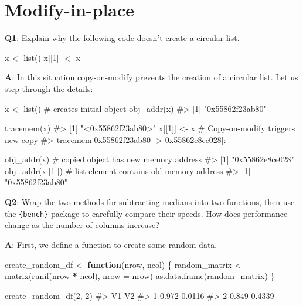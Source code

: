 \documentclass[
]{krantz}
\makeatletter
\newenvironment{Shaded}{\begin{snugshade}}{\end{snugshade}}
\newcommand{\CommentTok}[1]{\textcolor[rgb]{0.56,0.35,0.01}{\textit{#1}}}
\newcommand{\ControlFlowTok}[1]{\textcolor[rgb]{0.13,0.29,0.53}{\textbf{#1}}}
\newcommand{\DataTypeTok}[1]{\textcolor[rgb]{0.13,0.29,0.53}{#1}}
\newcommand{\DecValTok}[1]{\textcolor[rgb]{0.00,0.00,0.81}{#1}}
\newcommand{\KeywordTok}[1]{\textcolor[rgb]{0.13,0.29,0.53}{\textbf{#1}}}
\newcommand{\NormalTok}[1]{#1}
\newcommand{\OperatorTok}[1]{\textcolor[rgb]{0.81,0.36,0.00}{\textbf{#1}}}
\newcommand{\StringTok}[1]{\textcolor[rgb]{0.31,0.60,0.02}{#1}}
\newenvironment{kframe}{%
\medskip{}
\setlength{\fboxsep}{.8em}
 \def\at@end@of@kframe{}%
 \ifinner\ifhmode%
  \def\at@end@of@kframe{\end{minipage}}%
  \begin{minipage}{\columnwidth}%
 \fi\fi%
 \def\FrameCommand##1{\hskip\@totalleftmargin \hskip-\fboxsep
 \colorbox{shadecolor}{##1}\hskip-\fboxsep
     \hskip-\linewidth \hskip-\@totalleftmargin \hskip\columnwidth}%
 \MakeFramed {\advance\hsize-\width
   \@totalleftmargin\z@ \linewidth\hsize
   \@setminipage}}%
 {\par\unskip\endMakeFramed%
 \at@end@of@kframe}
\renewenvironment{Shaded}{\begin{kframe}}{\end{kframe}}
\renewcommand{\KeywordTok} [1]{\textcolor[rgb]{0.00,0.44,0.13}{{#1}}}
\renewcommand{\DataTypeTok}[1]{\textcolor[rgb]{0.56,0.13,0.00}{{#1}}}
\renewcommand{\DecValTok}  [1]{\textcolor[rgb]{0.25,0.63,0.44}{{#1}}}
\renewcommand{\StringTok}  [1]{\textcolor[rgb]{0.25,0.44,0.63}{{#1}}}
\renewcommand{\CommentTok} [1]{\textcolor[rgb]{0.38,0.63,0.69}{{#1}}}
\renewcommand{\NormalTok}  [1]{{#1}}
\makeatother
\begin{document}
\hypertarget{modify-in-place}{%
\section{Modify-in-place}\label{modify-in-place}}

\textbf{{Q1}}: Explain why the following code doesn't create a circular list.

\begin{Shaded}
\begin{Highlighting}[]
\NormalTok{x <-}\StringTok{ }\KeywordTok{list}\NormalTok{()}
\NormalTok{x[[}\DecValTok{1}\NormalTok{]] <-}\StringTok{ }\NormalTok{x}
\end{Highlighting}
\end{Shaded}

\textbf{{A}}: In this situation copy-on-modify prevents the creation of a circular list. Let us step through the details:

\begin{Shaded}
\begin{Highlighting}[]
\NormalTok{x <-}\StringTok{ }\KeywordTok{list}\NormalTok{()  }\CommentTok{# creates initial object}
\KeywordTok{obj_addr}\NormalTok{(x)}
\CommentTok{#> [1] "0x55862f23ab80"}

\KeywordTok{tracemem}\NormalTok{(x)}
\CommentTok{#> [1] "<0x55862f23ab80>"}
\NormalTok{x[[}\DecValTok{1}\NormalTok{]] <-}\StringTok{ }\NormalTok{x  }\CommentTok{# Copy-on-modify triggers new copy}
\CommentTok{#> tracemem[0x55862f23ab80 -> 0x55862e8ce028]:}

\KeywordTok{obj_addr}\NormalTok{(x)       }\CommentTok{# copied object has new memory address}
\CommentTok{#> [1] "0x55862e8ce028"}
\KeywordTok{obj_addr}\NormalTok{(x[[}\DecValTok{1}\NormalTok{]])  }\CommentTok{# list element contains old memory address}
\CommentTok{#> [1] "0x55862f23ab80"}
\end{Highlighting}
\end{Shaded}

\textbf{{Q2}}: Wrap the two methods for subtracting medians into two functions, then use the \texttt{\{bench\}} package to carefully compare their speeds. How does performance change as the number of columns increase?

\textbf{{A}}: First, we define a function to create some random data.

\begin{Shaded}
\begin{Highlighting}[]
\NormalTok{create_random_df <-}\StringTok{ }\ControlFlowTok{function}\NormalTok{(nrow, ncol) \{}
\NormalTok{  random_matrix <-}\StringTok{ }\KeywordTok{matrix}\NormalTok{(}\KeywordTok{runif}\NormalTok{(nrow }\OperatorTok{*}\StringTok{ }\NormalTok{ncol), }\DataTypeTok{nrow =}\NormalTok{ nrow)}
  \KeywordTok{as.data.frame}\NormalTok{(random_matrix)}
\NormalTok{\}}

\KeywordTok{create_random_df}\NormalTok{(}\DecValTok{2}\NormalTok{, }\DecValTok{2}\NormalTok{)}
\CommentTok{#>      V1     V2}
\CommentTok{#> 1 0.972 0.0116}
\CommentTok{#> 2 0.849 0.4339}
\end{Highlighting}
\end{Shaded}
\end{document}
